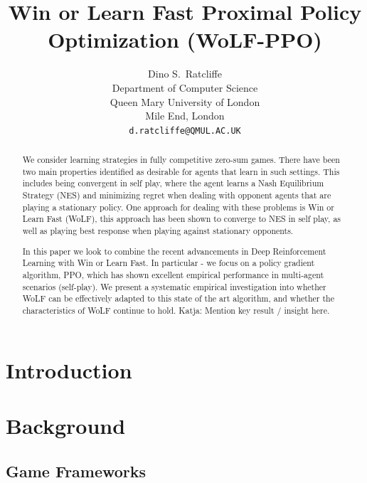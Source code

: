 \documentclass{article}
\title{Win or Learn Fast Proximal Policy Optimization (WoLF-PPO)}
\author{%
  Dino S.~Ratcliffe\\
  Department of Computer Science\\
  Queen Mary University of London\\
  Mile End, London \TODO{check proper address format} \\
  \texttt{d.ratcliffe@QMUL.AC.UK} \\
}
\newcommand\katja[1]{{\color{dark-cyan}Katja: #1}}
\begin{document}
\maketitle

\begin{abstract}
  We consider learning strategies in fully competitive zero-sum games. There have been two main properties identified as desirable for agents that learn in  such settings. This includes being convergent in self play, where the agent learns a Nash Equilibrium Strategy (NES) and minimizing regret when dealing with opponent agents that are playing a stationary policy. One approach for dealing with these problems is Win or Learn Fast (WoLF), this approach has been shown to converge to NES in self play, as well as playing best response when playing against stationary opponents. 

  In this paper we look to combine the recent advancements in Deep Reinforcement Learning with Win or Learn Fast. In particular - we focus on a policy gradient algorithm, PPO, which has shown excellent empirical performance in multi-agent scenarios (self-play). We present a systematic empirical investigation into whether WoLF can be effectively adapted to this state of the art algorithm, and whether the characteristics of WoLF continue to hold. \katja{Mention key result / insight here.}

\end{abstract}

\section{Introduction}

\section{Background}

\subsection{Game Frameworks}
\end{document}
